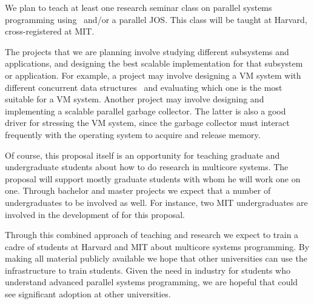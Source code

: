 We plan to teach at least one research seminar class on parallel
systems programming using \sys\ and/or a parallel JOS\@.
%
This class will be taught at Harvard, cross-registered at MIT\@.

The projects that we are planning involve studying different subsystems and
applications, and designing the best scalable implementation for that subsystem
or application. For example, a project may involve designing a VM system with
different concurrent data structures~\cite{herlihy:art} and evaluating which one
is the most suitable for a VM system.  Another project may involve designing and
implementing a scalable parallel garbage collector. The latter is also a good
driver for stressing the VM system, since the garbage collector must interact
frequently with the operating system to acquire and release memory.

Of course, this proposal itself is an opportunity for teaching graduate and
undergraduate students about how to do research in multicore systems.  The
proposal will support mostly graduate students with whom he will work one on
one.  Through bachelor and master projects we expect that a number of
undergraduates to be involved as well. For instance, two MIT undergraduates are
involved in the development of \sys for this proposal.

Through this combined approach of teaching and research we expect to train a
cadre of students at Harvard and MIT about multicore systems programming. By
making all material publicly available we hope that other universities can use
the \sys infrastructure to train students.  Given the need in industry for
students who understand advanced parallel systems programming, we are hopeful
that \sys could see significant adoption at other universities.


